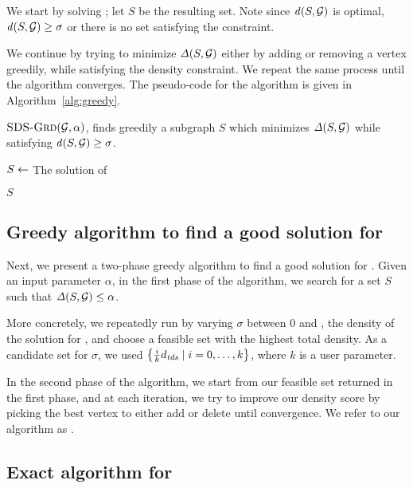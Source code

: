 We start by solving \problemdts; let $S$ be the resulting set. Note since $\dens{S, \calG}$ is optimal,
$\dens{S, \calG} \geq \sigma$  or there is no set satisfying the constraint. 

We continue by trying to minimize $\diff{S, \calG}$ either by adding or removing a vertex greedily, while satisfying the density constraint. We repeat the same process until the algorithm
converges. The pseudo-code for the algorithm is given in Algorithm~\ref{alg:greedy}.

\begin{algorithm}[t!]
\caption{$\textsc{SDS-Grd}({\mathcal G},\alpha)$, finds greedily a subgraph $S$ which minimizes $\diff{S, \calG}$ while satisfying $\dens{S, \calG} \geq \sigma$.}
\label{alg:greedy}
    $S \leftarrow $ The solution of \problemdts\;
	
	\Return $S$\;
\end{algorithm}

\subsection{Greedy algorithm to find a good solution for  \problemcdcsm} \label{subsec:greedy-algo-fds}

Next, we present a two-phase greedy algorithm to find a good solution for \problemcdcsm. Given an input parameter $\alpha$, in the first phase of the algorithm, we search for a set $S$ such that $\diff{S, \calG} \leq \alpha$.

More concretely,  we repeatedly run \alggrd by varying $\sigma$ between $0$ and \dentds, the density of the solution for \problemdts, and choose a feasible set with the highest total density. As a candidate set for $\sigma$, we used $\left\{\frac{i}{k}d_{\mathit{tds}} \mid i = 0, \ldots, k\right\}$, where $k$ is a user parameter.

In the second phase of the algorithm, we start from our feasible set returned in the first phase, and at each iteration, we try to improve our density score by picking the best vertex to either add or delete until convergence. We refer to our algorithm as \alggrdfms.


\subsection{Exact algorithm for \problemdcs}

